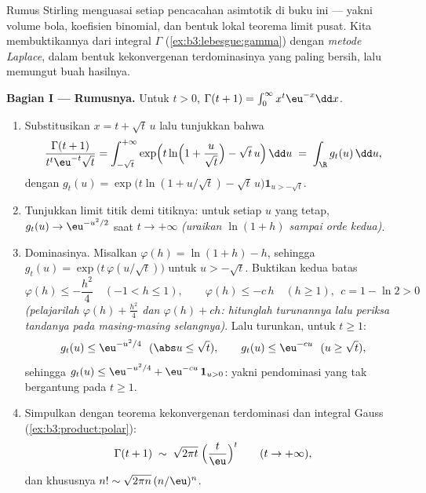 \begin{problem}
\label{pb:b3:product:1}
Rumus Stirling menguasai setiap pencacahan asimtotik di buku ini
--- yakni volume bola, koefisien binomial, dan bentuk lokal teorema
limit pusat. Kita membuktikannya dari integral $\Gamma$
(\cref{ex:b3:lebesgue:gamma}) dengan \emph{metode Laplace},
dalam bentuk kekonvergenan terdominasinya yang paling bersih, lalu memungut
buah hasilnya.

\medskip
\noindent\textbf{Bagian I --- Rumusnya.} Untuk $t > 0$,
$\Gamma(t + 1) = \int_0^\infty x^{t}\eu^{-x}\dd x$.
\begin{enumerate}
  \item Substitusikan $x = t + \sqrt t\,u$ lalu tunjukkan bahwa
        \[
        \frac{\Gamma(t+1)}{t^{t}\eu^{-t}\sqrt t}
        = \int_{-\sqrt t}^{+\infty}
        \exp\Bigl(t\ln\Bigl(1 + \frac u{\sqrt
        t}\Bigr) - \sqrt t\,u\Bigr)\,\dd u
        \;=\;\int_\R g_t(u)\,\dd u,
        \]
        dengan $g_t(u) = \exp\bigl(t\ln(1 + u/\sqrt t) -
        \sqrt t\,u\bigr)\mathbf 1_{u > -\sqrt t}$.
  \item Tunjukkan limit titik demi titiknya: untuk setiap $u$ yang tetap, $g_t(u)
        \to \eu^{-u^2/2}$ saat $t \to +\infty$ \emph{(uraikan
        $\ln(1 + h)$ sampai orde kedua)}.
  \item Dominasinya. Misalkan $\varphi(h) = \ln(1 + h) - h$, sehingga
        $g_t(u) = \exp\bigl(t\,\varphi(u/\sqrt t)\bigr)$ untuk
        $u > -\sqrt t$. Buktikan kedua batas
        \[
        \varphi(h) \leq -\frac{h^2}4 \quad (-1 < h \leq 1),
        \qquad
        \varphi(h) \leq -c\,h \quad (h \geq 1),\ \ c = 1 -
        \ln 2 > 0
        \]
        \emph{(pelajarilah $\varphi(h) + \frac{h^2}4$ dan $\varphi(h)
        + ch$: hitunglah turunannya lalu periksa tandanya pada
        masing-masing selangnya)}. Lalu turunkan, untuk $t \geq 1$:
        \[
        g_t(u) \leq \eu^{-u^2/4}\ \ (\abs u \leq \sqrt t),
        \qquad
        g_t(u) \leq \eu^{-cu}\ \ (u \geq \sqrt t),
        \]
        sehingga $g_t(u) \leq \eu^{-u^2/4} +
        \eu^{-cu}\,\mathbf 1_{u > 0}$: yakni pendominasi 
        yang tak bergantung pada $t \geq 1$.
  \item Simpulkan dengan teorema kekonvergenan terdominasi dan
        integral Gauss (\cref{ex:b3:product:polar}):
        \[
        \Gamma(t + 1) \;\sim\;
        \sqrt{2\pi t}\;\Bigl(\frac t\eu\Bigr)^{t}
        \qquad (t \to +\infty),
        \]
        dan khususnya $n! \sim \sqrt{2\pi
        n}\,(n/\eu)^n$.
\end{enumerate}


\end{problem}
